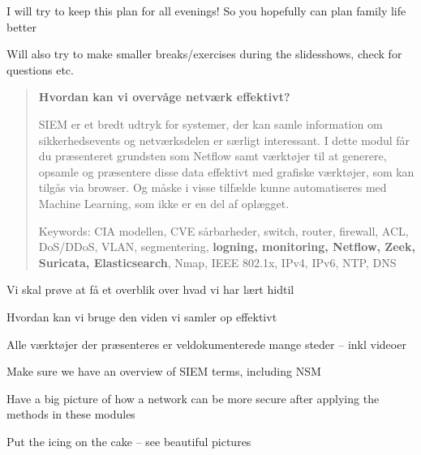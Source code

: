 \documentclass[Screen16to9,17pt]{foils}
\begin{document}
\centerline{I will try to keep this plan for all evenings! So you hopefully can plan family life better}

Will also try to make smaller breaks/exercises during the slidesshows, check for questions etc.





\begin{quote}
{\bf Hvordan kan vi overvåge netværk effektivt?}

SIEM er et bredt udtryk for systemer, der kan samle information om sikkerhedsevents og netværksdelen er særligt interessant. I dette modul får du præsenteret grundsten som Netflow samt værktøjer til at generere, opsamle og præsentere disse data effektivt med grafiske værktøjer, som kan tilgås via browser. Og måske i visse tilfælde kunne automatiseres med Machine Learning, som ikke er en del af oplægget.


\vskip 5mm
Keywords: CIA modellen, CVE sårbarheder, switch, router, firewall, ACL, DoS/DDoS, VLAN, segmentering, {\bf logning, monitoring, Netflow, Zeek, Suricata, \bf Elasticsearch}, Nmap, IEEE 802.1x, IPv4, IPv6, NTP, DNS
\end{quote}

\begin{list2}
\item Vi skal prøve at få et overblik over hvad vi har lært hidtil
\item Hvordan kan vi bruge den viden vi samler op effektivt
\item Alle værktøjer der præsenteres er veldokumenterede mange steder -- inkl videoer
\end{list2}






\begin{list2}
\item Make sure we have an overview of SIEM terms, including NSM
\item Have a big picture of how a network can be more secure after applying the methods in these modules
\item Put the icing on the cake -- see beautiful pictures
\end{list2}



\end{document}
